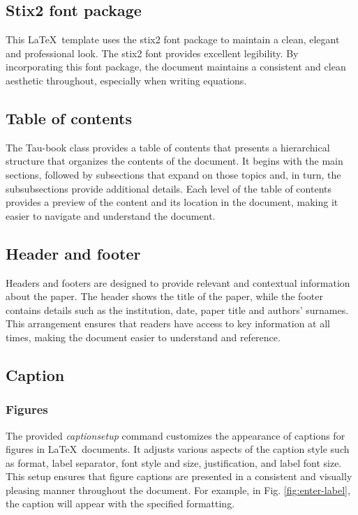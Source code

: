 \documentclass[10pt,a4paper,twoside]{tau-book}
\begin{document}
    \subsection{Stix2 font package}

        This \LaTeX\ template uses the stix2 font package to maintain a clean, elegant and professional look. The stix2 font provides excellent legibility. By incorporating this font package, the document maintains a consistent and clean aesthetic throughout, especially when writing equations. 

    \subsection{Table of contents}

        The Tau-book class provides a table of contents that presents a hierarchical structure that organizes the contents of the document. It begins with the main sections, followed by subsections that expand on those topics and, in turn, the subsubsections provide additional details. Each level of the table of contents provides a preview of the content and its location in the document, making it easier to navigate and understand the document.

    \subsection{Header and footer}

        Headers and footers are designed to provide relevant and contextual information about the paper. The header shows the title of the paper, while the footer contains details such as the institution, date, paper title and authors' surnames. This arrangement ensures that readers have access to key information at all times, making the document easier to understand and reference.
        
    \subsection{Caption}

        \subsubsection{Figures}
        
            The provided \textit{captionsetup} command customizes the appearance of captions for figures in \LaTeX\ documents. It adjusts various aspects of the caption style such as format, label separator, font style and size, justification, and label font size. This setup ensures that figure captions are presented in a consistent and visually pleasing manner throughout the document. For example, in Fig. \ref{fig:enter-label}, the caption will appear with the specified formatting.
\end{document}
